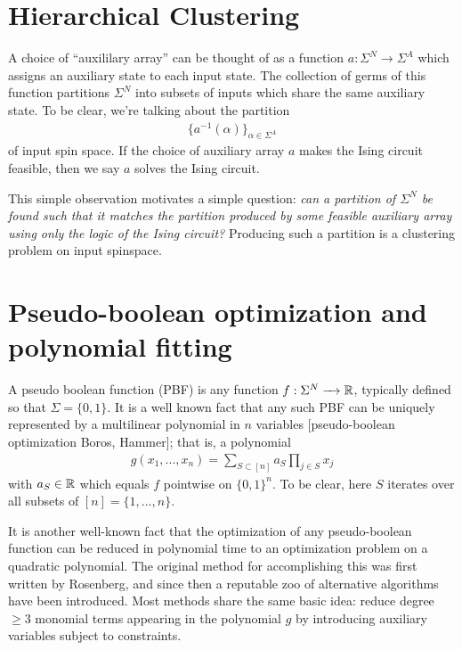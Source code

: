 \documentclass{article}
\begin{document}
\section{Hierarchical Clustering}

A choice of ``auxililary array'' can be thought of as a function $a:\Sigma^N \to \Sigma^A$ which assigns an auxiliary state to each input state. The collection of germs of this function partitions $\Sigma^N$ into subsets of inputs which share the same auxiliary state. To be clear, we're talking about the partition
\begin{align*}
  \{a^{-1}(\alpha)\}_{\alpha \in \Sigma^A}
\end{align*}
of input spin space. If the choice of auxiliary array $a$ makes the Ising circuit feasible, then we say $a$ solves the Ising circuit.

This simple observation motivates a simple question: \emph{can a partition of $\Sigma^N$ be found such that it matches the partition produced by some feasible auxiliary array using only the logic of the Ising circuit?} Producing such a partition is a clustering problem on input spinspace.

\section{Pseudo-boolean optimization and polynomial fitting}
A pseudo boolean function (PBF) is any function $f:\Sigma^N\to \bR$, typically defined so that $\Sigma = \{0,1\}$. It is a well known fact that any such PBF can be uniquely represented by a multilinear polynomial in $n$ variables [pseudo-boolean optimization Boros, Hammer]; that is, a polynomial
\begin{align*}
  g(x_1,...,x_n) = \sum_{S \subset [n]} a_S \prod_{j \in S}x_j
\end{align*}
with $a_S \in \mathbb{R}$ which equals $f$ pointwise on $\{0,1\}^n$. To be clear, here $S$ iterates over all subsets of $[n] = \{1,...,n\}$.

It is another well-known fact that the optimization of any pseudo-boolean function can be reduced in polynomial time to an optimization problem on a quadratic polynomial. The original method for accomplishing this was first written by Rosenberg, and since then a reputable zoo of alternative algorithms have been introduced. Most methods share the same basic idea: reduce degree $\geq 3$ monomial terms appearing in the polynomial $g$ by introducing auxiliary variables subject to constraints.
\end{document}
